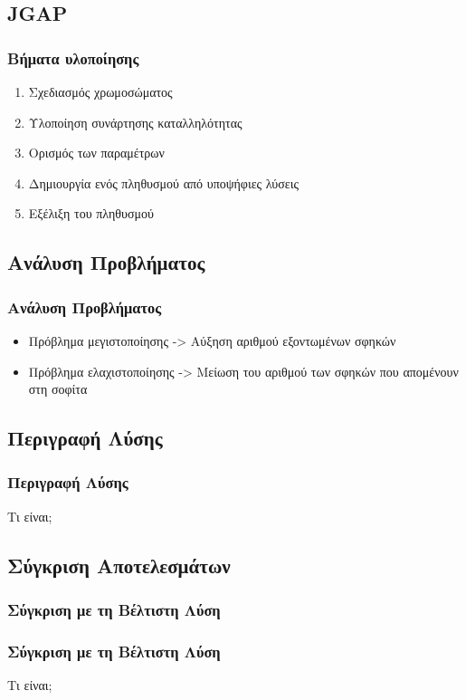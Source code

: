 \documentclass[xetex,mathserif,serif,14pt]{beamer}
\begin{document}
\subsection{JGAP}

\begin{frame}
\frametitle{Βήματα υλοποίησης}
\begin{enumerate}
  \item Σχεδιασμός χρωμοσώματος
  \item Υλοποίηση συνάρτησης καταλληλότητας
  \item Ορισμός των παραμέτρων
  \item Δημιουργία ενός πληθυσμού από υποψήφιες λύσεις
  \item Εξέλιξη του πληθυσμού
\end{enumerate}
\end{frame}

\subsection{Ανάλυση Προβλήματος}

\begin{frame}
\frametitle{Ανάλυση Προβλήματος}
\begin{itemize}
  \item Πρόβλημα μεγιστοποίησης -> Αύξηση αριθμού εξοντωμένων σφηκών
  \item Πρόβλημα ελαχιστοποίησης -> Μείωση του αριθμού των σφηκών που απομένουν στη σοφίτα
\end{itemize}
\end{frame}

\subsection{Περιγραφή Λύσης}

\begin{frame}
\frametitle{Περιγραφή Λύσης}
Τι είναι;
\end{frame}

\subsection{Σύγκριση Αποτελεσμάτων}

\subsubsection{Σύγκριση με τη Βέλτιστη Λύση}
\begin{frame}
\frametitle{Σύγκριση με τη Βέλτιστη Λύση}
Τι είναι;
\end{frame}
\end{document}
